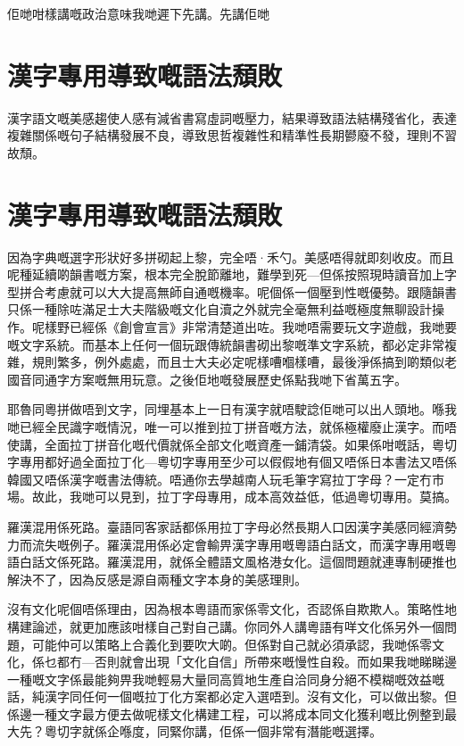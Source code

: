 佢哋咁樣講嘅政治意味我哋遲下先講。先講佢哋


\section{漢字專用導致嘅語法頹敗}
漢字語文嘅美感趨使人感有減省書寫虛詞嘅壓力，結果導致語法結構殘省化，表達複雜關係嘅句子結構發展不良，導致思哲複雜性和精準性長期鬰廢不發，理則不習故頹。

\section{漢字專用導致嘅語法頹敗}
因為字典嘅選字形狀好多拼砌起上黎，完全唔·禾勺。美感唔得就即刻收皮。而且呢種延續啲韻書嘅方案，根本完全脫節離地，難學到死—但係按照現時讀音加上字型拼合考慮就可以大大提高無師自通嘅機率。呢個係一個壓到性嘅優勢。跟隨韻書只係一種除咗滿足士大夫階級嘅文化自瀆之外就完全毫無利益嘅極度無聊設計操作。呢樣野已經係《創會宣言》非常清楚道出咗。我哋唔需要玩文字遊戲，我哋要嘅文字系統。而基本上任何一個玩跟傳統韻書砌出黎嘅準文字系統，都必定非常複雜，規則繁多，例外處處，而且士大夫必定呢樣嘈嗰樣嘈，最後淨係搞到啲類似老國音同通字方案嘅無用玩意。之後佢地嘅發展歷史係點我哋下省萬五字。

耶魯同粵拼做唔到文字，同埋基本上一日有漢字就唔駛諗佢哋可以出人頭地。喺我哋已經全民識字嘅情況，唯一可以推到拉丁拼音嘅方法，就係極權廢止漢字。而唔使講，全面拉丁拼音化嘅代價就係全部文化嘅資產一鋪清袋。如果係咁嘅話，粵切字專用都好過全面拉丁化—粵切字專用至少可以假假地有個又唔係日本書法又唔係韓國又唔係漢字嘅書法傳統。唔通你去學越南人玩毛筆字寫拉丁字母？一定冇市場。故此，我哋可以見到，拉丁字母專用，成本高效益低，低過粵切專用。莫搞。

羅漢混用係死路。臺語同客家話都係用拉丁字母必然長期人口因漢字美感同經濟勢力而流失嘅例子。羅漢混用係必定會輸畀漢字專用嘅粵語白話文，而漢字專用嘅粵語白話文係死路。羅漢混用，就係全體語文風格港女化。這個問題就連專制硬推也解決不了，因為反感是源自兩種文字本身的美感理則。

沒有文化呢個唔係理由，因為根本粵語而家係零文化，否認係自欺欺人。策略性地構建論述，就更加應該咁樣自己對自己講。你同外人講粵語有咩文化係另外一個問題，可能仲可以策略上合義化到要吹大啲。但係對自己就必須承認，我哋係零文化，係乜都冇—否則就會出現「文化自信」所帶來嘅慢性自殺。而如果我哋睇睇邊一種嘅文字係最能夠畀我哋輕易大量同高質地生產自洽同身分絕不模糊嘅效益嘅話，純漢字同任何一個嘅拉丁化方案都必定入選唔到。沒有文化，可以做出黎。但係邊一種文字最方便去做呢樣文化構建工程，可以將成本同文化獲利嘅比例整到最大先？粵切字就係企喺度，同緊你講，佢係一個非常有潛能嘅選擇。

